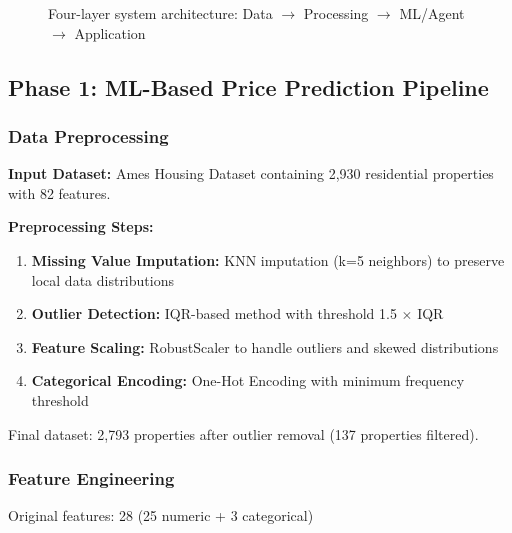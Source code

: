 \documentclass[11pt,a4paper]{article}
\begin{document}
\begin{figure}[h!]
    \caption{Four-layer system architecture: Data $\rightarrow$ Processing $\rightarrow$ ML/Agent $\rightarrow$ Application}
\end{figure}

\subsection{Phase 1: ML-Based Price Prediction Pipeline}

\subsubsection{Data Preprocessing}

\textbf{Input Dataset:} Ames Housing Dataset containing 2,930 residential properties with 82 features.

\textbf{Preprocessing Steps:}

\begin{enumerate}
    \item \textbf{Missing Value Imputation:} KNN imputation (k=5 neighbors) to preserve local data distributions
    \item \textbf{Outlier Detection:} IQR-based method with threshold 1.5 $\times$ IQR
    \item \textbf{Feature Scaling:} RobustScaler to handle outliers and skewed distributions
    \item \textbf{Categorical Encoding:} One-Hot Encoding with minimum frequency threshold
\end{enumerate}

Final dataset: 2,793 properties after outlier removal (137 properties filtered).

\subsubsection{Feature Engineering}

Original features: 28 (25 numeric + 3 categorical)
\end{document}
